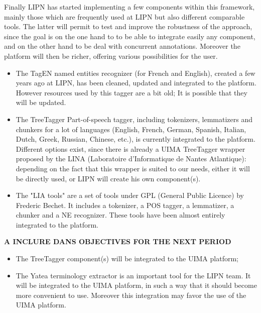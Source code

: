 Finally LIPN has started implementing a few components within this framework, mainly those which are frequently used at LIPN but also different comparable tools. The latter will permit to test and improve the robustness of the approach, since the goal is on the one hand to to be able to integrate easily any component, and on the other hand to be deal with concurrent annotations. Moreover the platform will then be richer, offering various possibilities for the user.

\begin{itemize}
\item The TagEN named entities recognizer (for French and English), created a few years ago at LIPN, has been cleaned, updated and integrated to the platform. However resources used by this tagger are a bit old; It is possible that they will be updated.
\item The TreeTagger Part-of-speech tagger, including tokenizers, lemmatizers and chunkers for a lot of languages (English, French, German, Spanish, Italian, Dutch, Greek, Russian, Chinese, etc.), is currently integrated to the platform. Different options exist, since there is already a UIMA TreeTagger wrapper proposed by the LINA (Laboratoire d'Informatique de Nantes Atlantique): depending on the fact that this wrapper is suited to our needs, either it will be directly used, or LIPN will create his own component(s).
\item The "LIA tools" are a set of tools under GPL (General Public Licence) by Frederic Bechet. It includes a tokenizer, a POS tagger, a lemmatizer, a chunker and a NE recognizer. These tools have been almost entirely integrated to the platform.
\end{itemize}




{\bf A INCLURE DANS OBJECTIVES FOR THE NEXT PERIOD}

\begin{itemize}
\item The TreeTagger component(s) will be integrated to the UIMA platform;
\item The Yatea terminology extractor is an important tool for the LIPN team. It will be integrated to the UIMA platform, in such a way that it should become more convenient to use. Moreover this integration may favor the use of the UIMA platform. 
\end{itemize}

